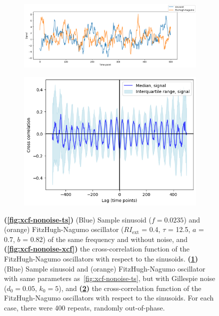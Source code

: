 \begin{figure}[hb!]
  \begin{subfigure}[t]{0.6\textwidth}
  \centering
    \includegraphics[width=\linewidth]{sinusoid_and_fitzhughnagumo_gillnoise.png}
    \caption{
    }
    \label{fig:xcf-gillnoise-ts}
  \end{subfigure}%
  \centering
  \begin{subfigure}[t]{0.4\textwidth}
  \centering
    \includegraphics[width=\linewidth]{randomshift_sinusoid_fitzhughnagumo_gillnoise_xcf.png}
    \caption{
    }
    \label{fig:xcf-gillnoise-xcf}
  \end{subfigure}

  \caption[
    Sample sinusoid and FitzHugh-Nagumo oscillators without noise and with Gillespie noise, along with their cross-correlation functions.
  ]{
    \textbf{(\ref{fig:xcf-nonoise-ts})}
    (Blue) Sample sinusoid ($f = 0.0235$) and (orange) FitzHugh-Nagumo oscillator ($RI_{\mathrm{ext}}$ = 0.4, $\tau$ = 12.5, $a$ = 0.7, $b$ = 0.82) of the same frequency and without noise, and
    \textbf{(\ref{fig:xcf-nonoise-xcf})}
    the cross-correlation function of the FitzHugh-Nagumo oscillators with respect to the sinusoids.
    \textbf{(\ref{fig:xcf-gillnoise-ts})}
    (Blue) Sample sinusoid and (orange) FitzHugh-Nagumo oscillator with same parameters as~\ref{fig:xcf-nonoise-ts}, but with Gillespie noise ($d_{0} = 0.05$, $k_{0} = 5$), and
    \textbf{(\ref{fig:xcf-gillnoise-xcf})}
    the cross-correlation function of the FitzHugh-Nagumo oscillators with respect to the sinusoids.
    For each case, there were 400 repeats, randomly out-of-phase.
  }
  \label{fig:xcf}
\end{figure}


